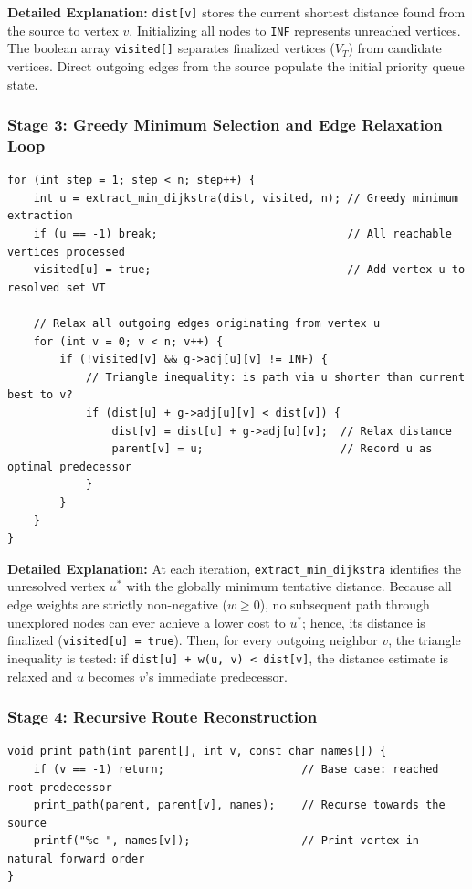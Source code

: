 \documentclass[11pt,a4paper]{article}
\begin{document}
\noindent \textbf{Detailed Explanation:}
\texttt{dist[v]} stores the current shortest distance found from the source to vertex $v$. Initializing all nodes to \texttt{INF} represents unreached vertices. The boolean array \texttt{visited[]} separates finalized vertices ($V_T$) from candidate vertices. Direct outgoing edges from the source populate the initial priority queue state.

\subsubsection{Stage 3: Greedy Minimum Selection and Edge Relaxation Loop}
\begin{lstlisting}[style=cstyle, caption={Greedy selection and triangle inequality relaxation}]
for (int step = 1; step < n; step++) {
    int u = extract_min_dijkstra(dist, visited, n); // Greedy minimum extraction
    if (u == -1) break;                             // All reachable vertices processed
    visited[u] = true;                              // Add vertex u to resolved set VT

    // Relax all outgoing edges originating from vertex u
    for (int v = 0; v < n; v++) {
        if (!visited[v] && g->adj[u][v] != INF) {
            // Triangle inequality: is path via u shorter than current best to v?
            if (dist[u] + g->adj[u][v] < dist[v]) {
                dist[v] = dist[u] + g->adj[u][v];  // Relax distance
                parent[v] = u;                     // Record u as optimal predecessor
            }
        }
    }
}
\end{lstlisting}

\noindent \textbf{Detailed Explanation:}
At each iteration, \texttt{extract\_min\_dijkstra} identifies the unresolved vertex $u^*$ with the globally minimum tentative distance. Because all edge weights are strictly non-negative ($w \ge 0$), no subsequent path through unexplored nodes can ever achieve a lower cost to $u^*$; hence, its distance is finalized (\texttt{visited[u] = true}). Then, for every outgoing neighbor $v$, the triangle inequality is tested: if \texttt{dist[u] + w(u, v) < dist[v]}, the distance estimate is relaxed and $u$ becomes $v$'s immediate predecessor.

\subsubsection{Stage 4: Recursive Route Reconstruction}
\begin{lstlisting}[style=cstyle, caption={Recursive back-tracing to display the full optimal route}]
void print_path(int parent[], int v, const char names[]) {
    if (v == -1) return;                     // Base case: reached root predecessor
    print_path(parent, parent[v], names);    // Recurse towards the source
    printf("%c ", names[v]);                 // Print vertex in natural forward order
}
\end{lstlisting}
\end{document}
